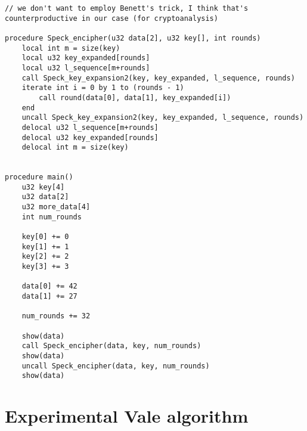 \documentclass[a4paper,10pt,openright]{memoir}
\begin{document}
\begin{lstlisting}[language=Janus,breaklines=true]
// we don't want to employ Benett's trick, I think that's counterproductive in our case (for cryptoanalysis)

procedure Speck_encipher(u32 data[2], u32 key[], int rounds)
    local int m = size(key)
    local u32 key_expanded[rounds]
    local u32 l_sequence[m+rounds]
    call Speck_key_expansion2(key, key_expanded, l_sequence, rounds)
    iterate int i = 0 by 1 to (rounds - 1)
        call round(data[0], data[1], key_expanded[i])
    end
    uncall Speck_key_expansion2(key, key_expanded, l_sequence, rounds)
    delocal u32 l_sequence[m+rounds]
    delocal u32 key_expanded[rounds]
    delocal int m = size(key)


procedure main()
    u32 key[4]
    u32 data[2]
    u32 more_data[4]
    int num_rounds

    key[0] += 0
    key[1] += 1
    key[2] += 2
    key[3] += 3
    
    data[0] += 42
    data[1] += 27
    
    num_rounds += 32
    
    show(data)
    call Speck_encipher(data, key, num_rounds)
    show(data)
    uncall Speck_encipher(data, key, num_rounds)
    show(data)
\end{lstlisting}

\chapter{Experimental Vale algorithm}
\label{app:vale}
\end{document}
